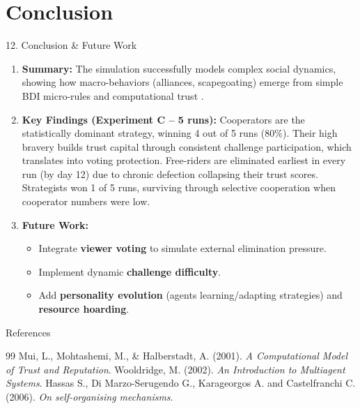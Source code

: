 \documentclass{beamer}
\begin{document}
\section{Conclusion}

\begin{frame}{12. Conclusion \& Future Work}
    \begin{enumerate}
        \item \textbf{Summary:} The simulation successfully models complex social dynamics, showing how macro-behaviors (alliances, scapegoating) emerge from simple BDI micro-rules and computational trust \cite{Wooldridge, Mui, Hassas}.
        \item \textbf{Key Findings (Experiment C -- 5 runs):} Cooperators are the statistically dominant strategy, winning 4 out of 5 runs (80\%). Their high bravery builds trust capital through consistent challenge participation, which translates into voting protection. Free-riders are eliminated earliest in every run (by day 12) due to chronic defection collapsing their trust scores. Strategists won 1 of 5 runs, surviving through selective cooperation when cooperator numbers were low.
        \item \textbf{Future Work:}
        \begin{itemize}
            \item Integrate \textbf{viewer voting} to simulate external elimination pressure.
            \item Implement dynamic \textbf{challenge difficulty}.
            \item Add \textbf{personality evolution} (agents learning/adapting strategies) and \textbf{resource hoarding}.
        \end{itemize}
    \end{enumerate}
\end{frame}

\begin{frame}{References}
    \footnotesize
    \begin{thebibliography}{99}
         Mui, L., Mohtashemi, M., \& Halberstadt, A. (2001). \textit{A Computational Model of Trust and Reputation}.
         Wooldridge, M. (2002). \textit{An Introduction to Multiagent Systems}.
         Hassas S., Di Marzo-Serugendo G., Karageorgos A. and Castelfranchi C. (2006). \textit{On self-organising mechanisms}.
    \end{thebibliography}
\end{frame}
\end{document}
